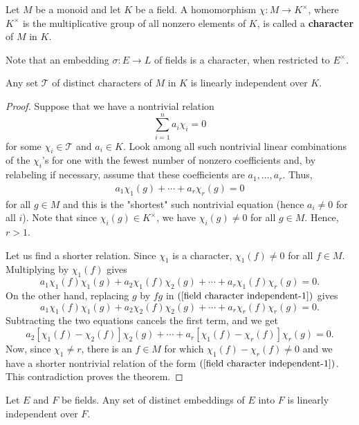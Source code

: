 \begin{definition}
Let $M$ be a monoid and let $K$ be a field. A homomorphism $\chi:M\to K^\times$, where $K^\times$ is the multiplicative group of all nonzero elements of $K$, is called a \textbf{character} of $M$ in $K$.
\end{definition}
Note that an embedding $\sigma:E\to L$ of fields is a character, when restricted to $E^\times$.
\begin{theorem}[E. Artin]
Any set $\mathcal{T}$ of distinct characters of $M$ in $K$ is linearly independent over $K$.
\end{theorem}
\begin{proof}
Suppose that we have a nontrivial relation
\[\sum_{i=1}^{n}a_i\chi_i=0\]
for some $\chi_i\in\mathcal{T}$ and $a_i\in K$. Look among all such nontrivial linear combinations of the $\chi_i$'s for one with the fewest number of nonzero coefficients and, by relabeling if necessary, assume that these coefficients are $a_1,\dots,a_r$. Thus,
\begin{align}\label{field character independent-1}
a_1\chi_1(g)+\cdots+a_r\chi_r(g)=0
\end{align}
for all $g\in M$ and this is the "shortest" such nontrivial equation (hence $a_i\neq 0$ for all $i$). Note that since $\chi_i(g)\in K^\times$, we have $\chi_i(g)\neq 0$ for all $g\in M$. Hence, $r>1$.\par
Let us find a shorter relation. Since $\chi_1$ is a character, $\chi_1(f)\neq 0$ for all $f\in M$. Multiplying by $\chi_1(f)$ gives
\[a_1\chi_1(f)\chi_1(g)+a_2\chi_1(f)\chi_2(g)+\cdots+a_r\chi_1(f)\chi_r(g)=0.\]
On the other hand, replacing $g$ by $fg$ in $(\ref{field character independent-1})$ gives
\[a_1\chi_1(f)\chi_1(g)+a_2\chi_2(f)\chi_2(g)+\cdots+a_r\chi_r(f)\chi_r(g)=0.\]
Subtracting the two equations cancels the first term, and we get
\[a_2[\chi_1(f)-\chi_2(f)]\chi_2(g)+\cdots+a_r[\chi_1(f)-\chi_r(f)]\chi_r(g)=0.\]
Now, since $\chi_1\neq r$, there is an $f\in M$ for which $\chi_1(f)-\chi_r(f)\neq 0$ and we have a shorter nontrivial relation of the form $(\ref{field character independent-1})$. This contradiction proves the theorem.
\end{proof}
\begin{corollary}\label{field embedding independent}
Let $E$ and $F$ be fields. Any set of distinct embeddings of $E$ into $F$ is linearly independent over $F$.
\end{corollary}
